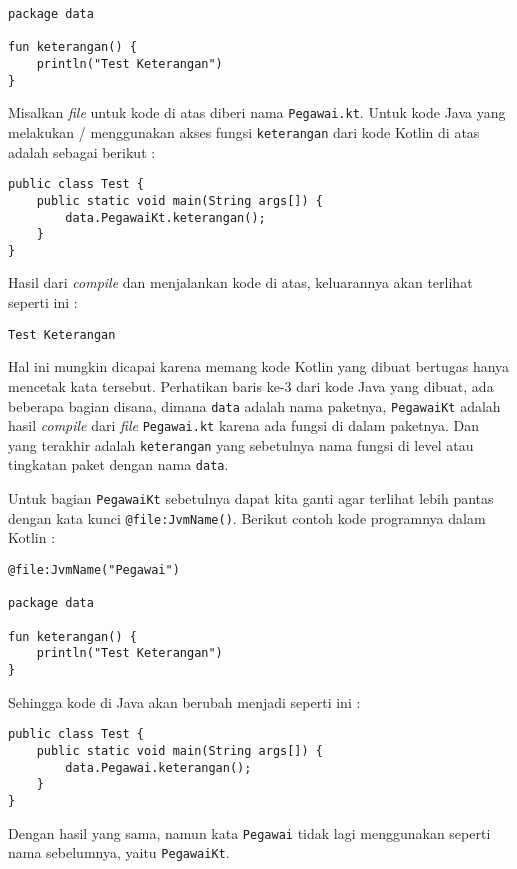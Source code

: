 \begin{lstlisting}
package data

fun keterangan() {
	println("Test Keterangan")
}
\end{lstlisting}

Misalkan \textit{file} untuk kode di atas diberi nama \texttt{Pegawai.kt}. Untuk kode Java yang melakukan / menggunakan akses fungsi \texttt{keterangan} dari kode Kotlin di atas adalah sebagai berikut :

\begin{lstlisting}
public class Test {
	public static void main(String args[]) {
		data.PegawaiKt.keterangan();
	}
}
\end{lstlisting}

Hasil dari \textit{compile} dan menjalankan kode di atas, keluarannya akan terlihat seperti ini :

\begin{lstlisting}
Test Keterangan
\end{lstlisting}

Hal ini mungkin dicapai karena memang kode Kotlin yang dibuat bertugas hanya mencetak kata tersebut. Perhatikan baris ke-3 dari kode Java yang dibuat, ada beberapa bagian disana, dimana \texttt{data} adalah nama paketnya, \texttt{PegawaiKt} adalah hasil \textit{compile} dari \textit{file} \texttt{Pegawai.kt} karena ada fungsi di dalam paketnya. Dan yang terakhir adalah \texttt{keterangan} yang sebetulnya nama fungsi di level atau tingkatan paket dengan nama \texttt{data}.

Untuk bagian \texttt{PegawaiKt} sebetulnya dapat kita ganti agar terlihat lebih pantas dengan kata kunci \texttt{@file:JvmName()}. Berikut contoh kode programnya dalam Kotlin :

\begin{lstlisting}
@file:JvmName("Pegawai")

package data

fun keterangan() {
	println("Test Keterangan")
}
\end{lstlisting}

Sehingga kode di Java akan berubah menjadi seperti ini :

\begin{lstlisting}
public class Test {
	public static void main(String args[]) {
		data.Pegawai.keterangan();
	}
}
\end{lstlisting}

Dengan hasil yang sama, namun kata \texttt{Pegawai} tidak lagi menggunakan seperti nama sebelumnya, yaitu \texttt{PegawaiKt}.

